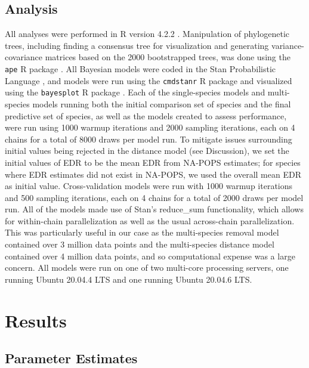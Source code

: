 \documentclass[12pt]{article}
\begin{document}
\subsection{Analysis}
\par All analyses were performed in R version 4.2.2 \citep{r_core_team_r_2022}.
Manipulation of phylogenetic trees, including finding a consensus tree for visualization and generating variance-covariance matrices based on the 2000 bootstrapped trees, was done using the \texttt{ape} R package \citep{paradis_ape_2019}.
All Bayesian models were coded in the Stan Probabilistic Language \cite{stan_development_team_stan_2019}, and models were run using the \texttt{cmdstanr} R package \citep{gabry_cmdstanr_2022} and visualized using the \texttt{bayesplot} R package \citep{gabry_visualization_2019}.
Each of the single-species models and multi-species models running both the initial comparison set of species and the final predictive set of species, as well as the models created to assess performance, were run using 1000 warmup iterations and 2000 sampling iterations, each on 4 chains for a total of 8000 draws per model run.
To mitigate issues surrounding initial values being rejected in the distance model (see Discussion), we set the initial values of EDR to be the mean EDR from NA-POPS estimates; for species where EDR estimates did not exist in NA-POPS, we used the overall mean EDR as initial value.
Cross-validation models were run with 1000 warmup iterations and 500 sampling iterations, each on 4 chains for a total of 2000 draws per model run.
All of the models made use of Stan's reduce\_sum functionality, which allows for within-chain parallelization as well as the usual across-chain parallelization.
This was particularly useful in our case as the multi-species removal model contained over 3 million data points and the multi-species distance model contained over 4 million data points, and so computational expense was a large concern.
All models were run on one of two multi-core processing servers, one running Ubuntu 20.04.4 LTS and one running Ubuntu 20.04.6 LTS.


\section{Results}
\subsection{Parameter Estimates}
\end{document}
